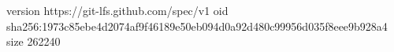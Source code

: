 version https://git-lfs.github.com/spec/v1
oid sha256:1973c85ebe4d2074af9f46189e50eb094d0a92d480c99956d035f8eee9b928a4
size 262240
